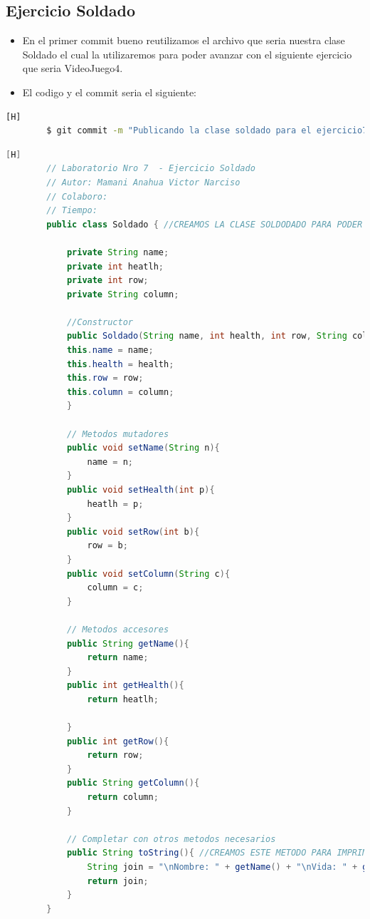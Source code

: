 \documentclass{article}
\begin{document}
	\subsection{Ejercicio Soldado}
	\begin{itemize}	
		\item En el primer commit bueno reutilizamos el archivo que seria nuestra clase Soldado el cual la utilizaremos para poder avanzar con el siguiente ejercicio que seria VideoJuego4.
		\item El codigo y el commit seria el siguiente:
	\end{itemize}	
	\begin{lstlisting}[language=bash,caption={Commit}][H]
		$ git commit -m "Publicando la clase soldado para el ejercicio7 la cual es la clase soldado donde estan los atributos mas importantes que nos serviran"
	\end{lstlisting}	
	\begin{lstlisting}[language=java,caption={Las lineas de codigos del metodo creado:}][H]
		// Laboratorio Nro 7  - Ejercicio Soldado
		// Autor: Mamani Anahua Victor Narciso
		// Colaboro:
		// Tiempo:
		public class Soldado { //CREAMOS LA CLASE SOLDODADO PARA PODER USAR UN ARREGLO BIDIMENSIONAL DONDE NECESITAMOS LA VIDA , EL NOMBRE DEL SOLDADO Y TAMBIEN SU POSICION COMO LA FILA Y LA COLUMNA   

			private String name;
			private int heatlh; 
			private int row;
			private String column;

			//Constructor
			public Soldado(String name, int health, int row, String column){
			this.name = name;
			this.health = health;
			this.row = row;
			this.column = column;
			}

			// Metodos mutadores
			public void setName(String n){
				name = n;
			}
			public void setHealth(int p){
				heatlh = p;
			}
			public void setRow(int b){
				row = b;
			}
			public void setColumn(String c){
				column = c; 
			}

			// Metodos accesores
			public String getName(){
				return name;
			}
			public int getHealth(){
				return heatlh;

			}
			public int getRow(){
				return row;
			}
			public String getColumn(){
				return column;
			}

			// Completar con otros metodos necesarios
			public String toString(){ //CREAMOS ESTE METODO PARA IMPRIMIR LOS DATOS DEl OBJETO
				String join = "\nNombre: " + getName() + "\nVida: " + getHealth() + "\nFila: " + getRow() + "\nColumna: " + getColumn(); //Agregamos un espaciador para poder separar
				return join;
			}
		}
	\end{lstlisting}
\end{document}
